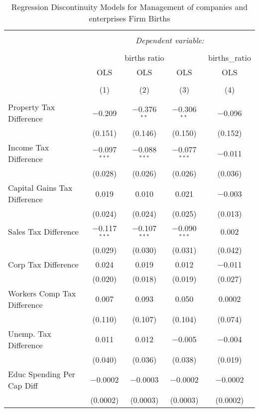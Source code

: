 
\begin{table}[!htbp] \centering 
  \caption{Regression Discontinuity Models for  Management of companies and enterprises Firm Births} 
  \label{55rd} 
\begin{tabular}{@{\extracolsep{5pt}}lcccc} 
\\[-1.8ex]\hline 
\hline \\[-1.8ex] 
 & \multicolumn{4}{c}{\textit{Dependent variable:}} \\ 
\cline{2-5} 
\\[-1.8ex] & \multicolumn{3}{c}{births ratio} & births\_ratio \\ 
 & OLS & OLS & OLS & OLS \\ 
\\[-1.8ex] & (1) & (2) & (3) & (4)\\ 
\hline \\[-1.8ex] 
 Property Tax Difference & $-$0.209 & $-$0.376$^{**}$ & $-$0.306$^{**}$ & $-$0.096 \\ 
  & (0.151) & (0.146) & (0.150) & (0.152) \\ 
  Income Tax Difference & $-$0.097$^{***}$ & $-$0.088$^{***}$ & $-$0.077$^{***}$ & $-$0.011 \\ 
  & (0.028) & (0.026) & (0.026) & (0.036) \\ 
  Capital Gains Tax Difference & 0.019 & 0.010 & 0.021 & $-$0.003 \\ 
  & (0.024) & (0.024) & (0.025) & (0.013) \\ 
  Sales Tax Difference & $-$0.117$^{***}$ & $-$0.107$^{***}$ & $-$0.090$^{***}$ & 0.002 \\ 
  & (0.029) & (0.030) & (0.031) & (0.042) \\ 
  Corp Tax Difference & 0.024 & 0.019 & 0.012 & $-$0.011 \\ 
  & (0.020) & (0.018) & (0.019) & (0.027) \\ 
  Workers Comp Tax Difference & 0.007 & 0.093 & 0.050 & 0.0002 \\ 
  & (0.110) & (0.107) & (0.104) & (0.074) \\ 
  Unemp. Tax Difference & 0.011 & 0.012 & $-$0.005 & $-$0.004 \\ 
  & (0.040) & (0.036) & (0.038) & (0.019) \\ 
  Educ Spending Per Cap Diff & $-$0.0002 & $-$0.0003 & $-$0.0002 & $-$0.0002 \\ 
  & (0.0002) & (0.0003) & (0.0003) & (0.0002) \\ 

\end{tabular}
\end{table}
